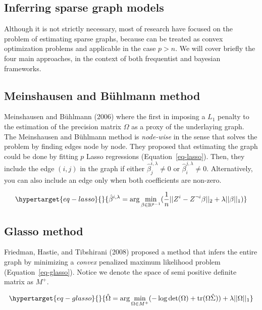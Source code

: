 \documentclass[
  letterpaper,
  DIV=11,
  numbers=noendperiod]{scrartcl}
\begin{document}
\hypertarget{inferring-sparse-graph-models}{%
\subsection{Inferring sparse graph
models}\label{inferring-sparse-graph-models}}

Although it is not strictly necessary, most of research have focused on
the problem of estimating sparse graphs, because can be treated as
convex optimization problems and applicable in the case \(p>n\). We will
cover briefly the four main approaches, in the context of both
frequentist and bayesian frameworks.

\hypertarget{meinshausen-and-buxfchlmann-method}{%
\subsection{Meinshausen and Bühlmann
method}\label{meinshausen-and-buxfchlmann-method}}

Meinshausen and Bühlmann (2006) where the first in imposing a \(L_1\)
penalty to the estimation of the precision matrix \(\Omega\) as a proxy
of the underlaying graph. The Meinshausen and Bühlmann method is
\emph{node-wise} in the sense that solves the problem by finding edges
node by node. They proposed that estimating the graph could be done by
fitting \(p\) Lasso regressions (Equation~\ref{eq-lasso}). Then, they
include the edge \((i, j)\) in the graph if either
\(\hat \beta^{i, \lambda}_j \ne0\) or
\(\hat \beta^{j, \lambda}_i \ne0\). Alternatively, you can also include
an edge only when both coefficients are non-zero.

\begin{equation}\protect\hypertarget{eq-lasso}{}{
\hat \beta^{i, \lambda} = \arg \min_{\beta \in \mathbb R^{p-1}} (\frac 1 n ||Z^i-Z^{\neg i}\beta||_2 + \lambda||\beta||_1) 
}\label{eq-lasso}\end{equation}

\hypertarget{glasso-method}{%
\subsection{Glasso method}\label{glasso-method}}

Friedman, Hastie, and Tibshirani (2008) proposed a method that infers
the entire graph by minimizing a \emph{convex} penalized maximum
likelihood problem (Equation~\ref{eq-glasso}). Notice we denote the
space of semi positive definite matrix as \(M^+\).

\begin{equation}\protect\hypertarget{eq-glasso}{}{
\hat \Omega = \arg \min_{\Omega \in M^+} (-\log\det(\Omega) + \text{tr}(\Omega\hat \Sigma)) + \lambda ||\Omega||_1
}\label{eq-glasso}\end{equation}
\end{document}
